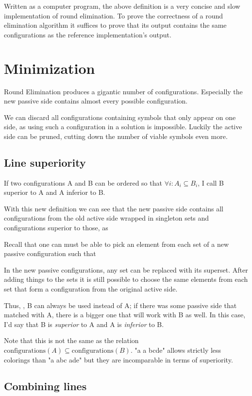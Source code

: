 \documentclass[english, 12pt, a4paper, sci, utf8, a-1b, online]{aaltothesis}
\begin{document}
Written as a computer program, the above definition is a very concise and slow implementation of round elimination. To prove the correctness of a round elimination algorithm it suffices to prove that its output contains the same configurations as the reference implementation's output.

\section{Minimization}

Round Elimination produces a gigantic number of configurations. Especially the new passive side contains almost every possible configuration.

We can discard all configurations containing symbols that only appear on one side, as using such a configuration in a solution is impossible. Luckily the active side can be pruned, cutting down the number of viable symbols even more. 

\subsection{Line superiority}

If two configurations A and B can be ordered so that $\forall i : A_i \subseteq B_i$, I call B superior to A and A inferior to B.

With this new definition we can see that the new passive side contains all configurations from the old active side wrapped in singleton sets and configurations superior to those, as

Recall that one can must be able to pick an element from each set of a new passive configuration such that

In the new passive configurations, any set can be replaced with its superset. After adding things to the sets it is still possible to choose the same elements from each set that form a configuration from the original active side.

Thus, , B can always be used instead of A; if there was some passive side that matched with A, there is a bigger one that will work with B as well. In this case, I'd say that B is \emph{superior} to A and A is \emph{inferior} to B.

Note that this is not the same as the relation $\text{configurations}(A) \subseteq \text{configurations}(B)$. "a a bcde" allows strictly less colorings than "a abc ade" but they are incomparable in terms of superiority.

\subsection{Combining lines}
\end{document}
